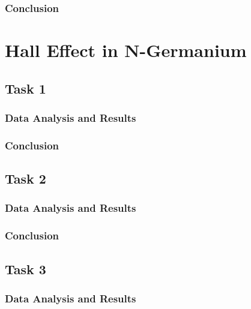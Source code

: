 \documentclass[a4paper]{article}
\begin{document}
\subsubsection{Conclusion}

\section{Hall Effect in N-Germanium}

\subsection{Task 1}

\subsubsection{Data Analysis and Results}

\subsubsection{Conclusion}

\subsection{Task 2}

\subsubsection{Data Analysis and Results}

\subsubsection{Conclusion}

\subsection{Task 3}

\subsubsection{Data Analysis and Results}
\end{document}
